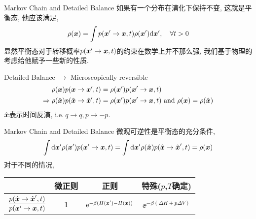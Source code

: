     \begin{frame}{Markov Chain and Detailed Balance}
        如果有一个分布在演化下保持不变, 这就是平衡态, 他应该满足,
        \begin{equation}
            \rho(\vb*x) = \int p(\vb*x'\to\vb*x, t)\rho(\vb*x')\dd\vb*x',\quad\forall t>0
        \end{equation}
        显然平衡态对于转移概率$p(\vb*x'\to\vb*x,t)$的约束在数学上并不那么强, 我们基于物理的考虑给他赋予一些新的性质.
        \begin{block}{Detailed Balance $\to$ Microscopically reversible}
            \noindent
            \begin{equation}
                \begin{split}
                    \rho(\vb*x)p(\vb*x\to\vb*x',t) &= \rho(\vb*x')p(\vb*x'\to\vb*x,t)\\ \Rightarrow
                    \rho(\hat{\vb*x})p(\hat{\vb*x}\to\hat{\vb*x}',t) &= \rho(\vb*x')p(\vb*x'\to\vb*x,t)\ \text{and}\ \rho(\vb*x) = \rho(\hat{\vb*x})                 
                \end{split}
            \end{equation}
            $\hat{\vb*x}$表示时间反演, i.e.$\ q\to q, p\to -p$.
        \end{block}
    \end{frame}
    \begin{frame}{Markov Chain and Detailed Balance}
        微观可逆性是平衡态的充分条件,
        \begin{equation}
            \int\dd\vb*x'\rho(\vb*x')p(\vb*x'\to\vb*x,t) = \int\dd\vb*x'\rho(\hat{\vb*x})p(\hat{\vb*x}\to\hat{\vb*x}',t) = \rho(\vb*x)
        \end{equation}
        对于不同的情况,
        \begin{table}[H]
            \centering
            \begin{tabular}{cccc}
                \toprule
                &微正则 & 正则 & 特殊($p$,$T$确定)\\
                \midrule
                $\dfrac{p(\hat{\vb*x}\to\hat{\vb*x}',t)}{p(\vb*x'\to\vb*x,t)}$ & 1 &$\mathrm{e}^{-\beta(H(\vb*x') - H(\vb*x))}$ & $\ee^{-\beta(\Delta H + p \Delta V)}$\\
                \bottomrule
            \end{tabular}
        \end{table}
    \end{frame}
